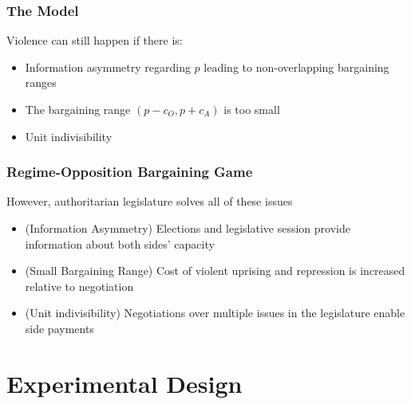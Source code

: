 \documentclass{beamer}
\begin{document}
\begin{frame}
\frametitle{The Model}
\centering
Violence can still happen if there is:
\begin{itemize}
\item Information asymmetry regarding $p$ leading to non-overlapping bargaining ranges
\item<2-> The bargaining range $(p - c_O, p + c_A)$ is too small
\item<3-> Unit indivisibility
\end{itemize}
\end{frame}

\begin{frame}
\frametitle{Regime-Opposition Bargaining Game}
However, authoritarian legislature solves all of these issues
\begin{itemize}
\item<1> (Information Asymmetry) Elections and legislative session provide information about both sides' capacity
\item<2> (Small Bargaining Range) Cost of violent uprising and repression is increased relative to negotiation
\item<3> (Unit indivisibility) Negotiations over multiple issues in the legislature enable side payments
\end{itemize}
\end{frame}
\section{Experimental Design}
\end{document}
